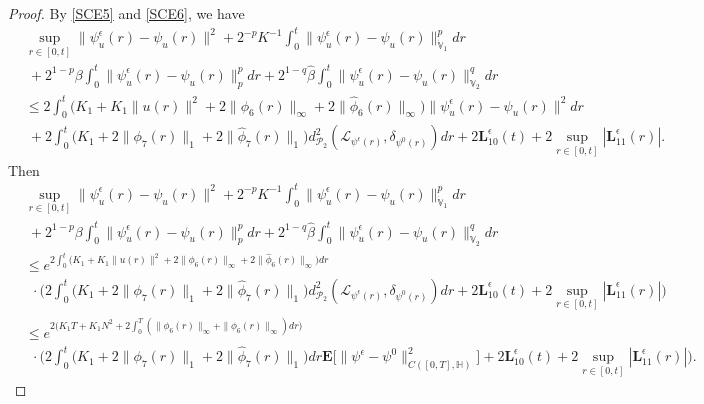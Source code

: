 \documentclass[11pt]{article}
\renewcommand{\leq}{\leqslant}
\numberwithin{equation}{section}
\begin{document}
\begin{proof}
By \eqref{SCE5} and \eqref{SCE6}, we have
\begin{align}\label{SCE5-1}
&\sup_{r\in [0,t]}\|\psi^\epsilon_u(r)-\psi_u(r)\|^2
+2^{-p}K^{-1}\int_0^{t}
\|\psi^\epsilon_u(r)
-\psi_u(r)\|^p_{\dot{\mathbb{V}}_1}dr
\nonumber\\&\ +2^{1-p}\beta
\int_0^{t}
\|\psi^\epsilon_u(r)
-\psi_u(r)\|_{p}^{p}dr
+2^{1-q}\widehat{\beta}
\int_0^{t}\|\psi^\epsilon_u(r)
-\psi_u(r)\|_{\mathbb{V}_2}^{q}dr \nonumber\\
&\leq
2\int_0^{t}
\big(K_1
+K_1\|u(r)\|^2
+2\|\phi_6(r)\|_{\infty}+
2\|\widehat{\phi}_6(r)\|_{\infty}\big)\|\psi^\epsilon_u(r)
-\psi_u(r)
\|^2dr
\nonumber\\&\ + 2\int_0^{t}
\big(K_1+2 \|\phi_7(r)\|_{1}+
2\|\widehat{\phi}_7(r)\|_{1}\big)
d_{\mathcal{P}_2}^2
(\mathcal{L}_{
\psi^\epsilon(r)},\delta_{\psi^0(r)})dr
+2\textbf{L}^\epsilon_{10}(t)
+2\sup_{r\in[0,t]}|\textbf{L}^\epsilon_{11}(r)|.
\end{align}
Then
\begin{align}\label{SCE5-2}
&\sup_{r\in [0,t]}\|\psi^\epsilon_u(r)-\psi_u(r)\|^2
+2^{-p}K^{-1}\int_0^{t}
\|\psi^\epsilon_u(r)
-\psi_u(r)\|^p_{\dot{\mathbb{V}}_1}dr
\nonumber\\&\ +2^{1-p}\beta
\int_0^{t}
\|\psi^\epsilon_u(r)
-\psi_u(r)\|_{p}^{p}dr
+2^{1-q}\widehat{\beta}
\int_0^{t}\|\psi^\epsilon_u(r)
-\psi_u(r)\|_{\mathbb{V}_2}^{q}dr \nonumber\\
&\leq
e^{2\int_0^{t}
\big(K_1
+K_1\|u(r)\|^2
+2\|\phi_6(r)\|_{\infty}+
2\|\widehat{\phi}_6(r)\|_{\infty}\big)dr}
\nonumber\\&\ \ \cdot\Big( 2\int_0^{t}
\big(K_1+2 \|\phi_7(r)\|_{1}+
2\|\widehat{\phi}_7(r)\|_{1}\big)
d_{\mathcal{P}_2}^2
(\mathcal{L}_{
\psi^\epsilon(r)},\delta_{\psi^0(r)})dr
+2\textbf{L}^\epsilon_{10}(t)
+2\sup_{r\in[0,t]}|\textbf{L}^\epsilon_{11}(r)|
\Big)
\nonumber\\
&\leq
e^{2
\big(K_1 T
+K_1 N^2
+2 \int_0^T \left(\|\phi_6(r)\|_{\infty}+
\|\widehat{\phi}_6(r)\|_{\infty}\right)dr \big)}
\nonumber\\&\ \ \cdot \Big(2\int_0^{t}
\big(K_1+2 \|\phi_7(r)\|_{1}+
2\|\widehat{\phi}_7(r)\|_{1}\big)dr
\mathbf{E}\Big[
\| \psi^\epsilon-\psi^0\|^2_{C([0,T],\mathbb{H} )}\Big]
+2\textbf{L}^\epsilon_{10}(t)
+2\sup_{r\in[0,t]}|\textbf{L}^\epsilon_{11}(r)|
\Big).
\end{align}


\end{proof}
\end{document}
